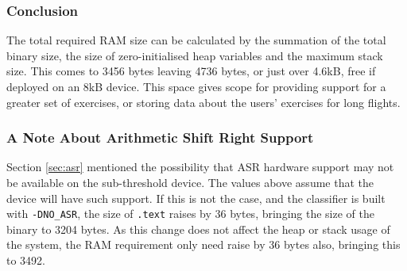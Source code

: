\subsubsection{Conclusion}

The total required RAM size can be calculated by the summation of the total binary size, the size of zero-initialised heap variables and the maximum stack size. This comes to 3456 bytes leaving 4736 bytes, or just over 4.6kB, free if deployed on an 8kB device. This space gives scope for providing support for a greater set of exercises, or storing data about the users' exercises for long flights.

\subsubsection{A Note About Arithmetic Shift Right Support}

Section \ref{sec:asr} mentioned the possibility that ASR hardware support may not be available on the sub-threshold device. The values above assume that the device will have such support. If this is not the case, and the classifier is built with \verb|-DNO_ASR|, the size of \verb|.text| raises by 36 bytes, bringing the size of the binary to 3204 bytes. As this change does not affect the heap or stack usage of the system, the RAM requirement only need raise by 36 bytes also, bringing this to 3492.
